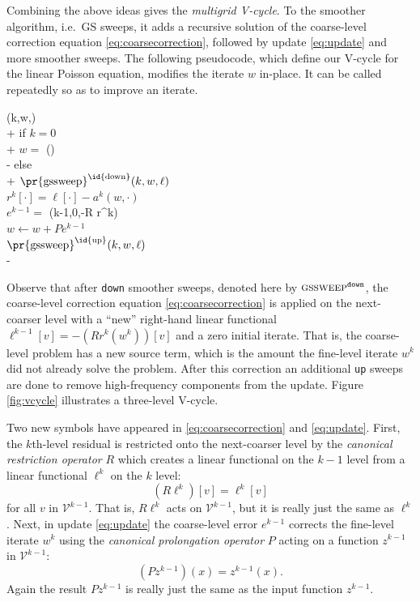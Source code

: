 \documentclass[letterpaper,final,12pt,reqno]{amsart}
\numberwithin{equation}{section}
\numberwithin{figure}{section}
\numberwithin{table}{section}
\begin{document}
Combining the above ideas gives the \emph{multigrid V-cycle}.  To the smoother algorithm, i.e.~GS sweeps, it adds a recursive solution of the coarse-level correction equation \eqref{eq:coarsecorrection}, followed by update \eqref{eq:update} and more smoother sweeps.  The following pseudocode, which define our V-cycle for the linear Poisson equation, modifies the iterate $w$ in-place.  It can be called repeatedly so as to improve an iterate.

\begin{pseudo*}
(k,w,\ell)\text{:} \\+
    if $k=0$ \\+
        $w =$ (\ell) \\-  %
    else \\+
        $\text{\pr{gssweep}}^{\text{\id{down}}}(k,w,\ell)$ \\
        $r^k[\cdot] = \ell[\cdot] - a^k(w,\cdot)$ \\
        $e^{k-1} =$ (k-1,0,-R r^k) \\
        $w \gets w + P e^{k-1}$ \\
        $\text{\pr{gssweep}}^{\text{\id{up}}}(k,w,\ell)$ \\-
\end{pseudo*}

Observe that after \texttt{down} smoother sweeps, denoted here by $\text{\textsc{gssweep}}^{\text{\texttt{down}}}$, the coarse-level correction equation \eqref{eq:coarsecorrection} is applied on the next-coarser level with a ``new'' right-hand linear functional $\ell^{k-1}[v]=-(R r^k(w^k))[v]$ and a zero initial iterate.  That is, the coarse-level problem has a new source term, which is the amount the fine-level iterate $w^k$ did not already solve the problem.  After this correction an additional \texttt{up} sweeps are done to remove high-frequency components from the update.  Figure \ref{fig:vcycle} illustrates a three-level V-cycle.

Two new symbols have appeared in \eqref{eq:coarsecorrection} and \eqref{eq:update}.  First, the $k$th-level residual is restricted onto the next-coarser level by the \emph{canonical restriction operator} $R$ which creates a linear functional on the $k-1$ level from a linear functional $\ell^k$ on the $k$ level:
\begin{equation}
  (R \ell^k)[v] = \ell^k[v] \label{eq:canonicalrestriction}
\end{equation}
for all $v$ in $\mathcal{V}^{k-1}$.  That is, $R \ell^k$ acts on $\mathcal{V}^{k-1}$, but it is really just the same as $\ell^k$.  Next, in update \eqref{eq:update} the coarse-level error $e^{k-1}$ corrects the fine-level iterate $w^k$ using the \emph{canonical prolongation operator} $P$ acting on a function $z^{k-1}$ in $\mathcal{V}^{k-1}$:
\begin{equation}
  (P z^{k-1})(x) = z^{k-1}(x). \label{eq:canonicalprolongation}
\end{equation}
Again the result $P z^{k-1}$ is really just the same as the input function $z^{k-1}$.
\end{document}
